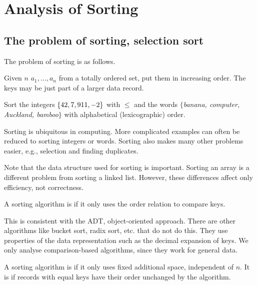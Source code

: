 \part{Analysis of Sorting}  
\label{ch:effsort}

\chapter{The problem of sorting, selection sort} %
\label{sec:sortingproblem}
The problem of sorting is as follows. 
\begin{Definition}
Given $n$  $a_1, \dots , a_n$ from a totally ordered set, put them in increasing order. 
The keys may be just part of a larger data record.
\end{Definition}
\begin{Boxample}[2]
Sort the integers $\mbox{$\{42, 7, 911, -2\}$}$ with $\leq$ 
and the words $\{$\textit{banana, computer, Auckland, bamboo}$\}$ with  alphabetical (lexicographic) order.
\end{Boxample}

Sorting is ubiquitous in computing. More complicated examples can often be reduced to sorting integers or words.
Sorting also makes many other problems easier, e.g., selection and finding duplicates.

Note that the data structure used for sorting is important. 
Sorting an array is a different problem from sorting a linked list. 
However, these differences affect  only efficiency, not correctness.  

\begin{Definition}
A sorting algorithm is  if it only uses the order relation to compare keys.
\end{Definition}

This is consistent with the ADT, object-oriented approach. 
There are other algorithms like bucket sort, radix sort, etc. that do not do this. 
They use properties of the data representation such as the decimal expansion of keys.
We only analyse comparison-based algorithms, since they work for general data.


\begin{Definition}
A sorting algorithm is  if it only uses fixed additional space, independent of $n$.
It is  if records with equal keys have their order unchanged by the algorithm.
\end{Definition}

